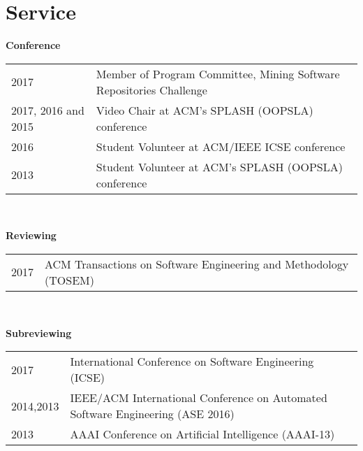 \documentclass[10pt]{article}
\begin{document}
\begin{outerlist}
\begin{innerlist}
\end{innerlist}

\end{outerlist}

\halfblankline


\vspace{-8pt}
\section{Service}



\vspace{10pt}
\textbf{Conference}\\
\vspace{-10pt}
\noindent\begin{tabular}{p{2.5cm}p{10.5cm}}
2017 & Member of Program Committee, Mining Software Repositories Challenge \\
2017, 2016 and 2015 &Video Chair at ACM's SPLASH (OOPSLA) conference\\
2016 &Student Volunteer at ACM/IEEE ICSE conference\\
2013 &Student Volunteer at ACM's SPLASH (OOPSLA) conference\\
\end{tabular}\\

\vspace{10pt}


\textbf{Reviewing}\\
\vspace{-10pt}
\noindent\begin{tabular}{p{2.5cm}p{10.5cm}}
2017 & ACM Transactions on Software Engineering and Methodology (TOSEM) \\
\end{tabular}\\

\vspace{10pt}

\textbf{Subreviewing}\\
\vspace{-10pt}
\noindent\begin{tabular}{p{2.5cm}p{10.5cm}}
2017 & International Conference on Software Engineering (ICSE) \\
2014,2013 & IEEE/ACM International Conference on Automated Software Engineering (ASE 2016) \\
2013 & AAAI Conference on Artificial Intelligence (AAAI-13)\\
\end{tabular}\\
\end{document}
